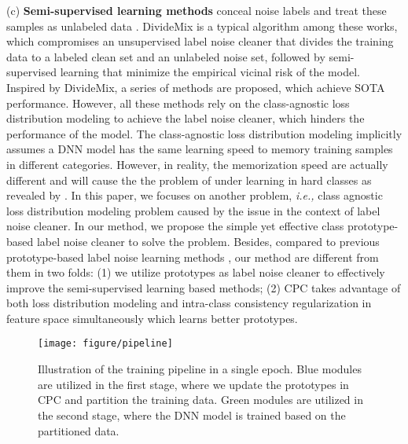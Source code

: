 \documentclass{article} \usepackage{iclr2023_conference,times}
\begin{document}
(c) \textbf{Semi-supervised learning methods} conceal noise labels and treat these samples as unlabeled data \citep{Ding2018AST}. DivideMix \citep{Li2020DivideMixLW} is a typical algorithm among these works, which compromises an unsupervised label noise cleaner that divides the training data to a labeled clean set and an unlabeled noise set, followed by semi-supervised learning that minimize the empirical vicinal risk of the model. Inspired by DivideMix, a series of methods \citep{cordeiro2022longremix,nishi2021augmentation,Cordeiro2021PropMixHS} are proposed, which achieve SOTA performance. However, all these methods rely on  the class-agnostic loss distribution modeling to achieve the label noise cleaner, which hinders the performance of the model. The class-agnostic loss distribution modeling implicitly assumes a DNN model has the same learning speed to memory training samples in different categories. However, in reality, the memorization speed are actually different and will cause the the problem of under learning in hard classes as revealed by \citet{wang2019symmetric}. In this paper, we focuses on another problem, \emph{i.e.,} class agnostic loss distribution modeling problem caused by the issue in the context of label noise cleaner. In our method, we propose the simple yet effective class prototype-based label noise cleaner to solve the problem. Besides, compared to previous prototype-based label noise learning methods \citep{li2020mopro,li2021learning}, our method are different from them in two folds: (1) we utilize prototypes as label noise cleaner to effectively improve the semi-supervised learning based methods; (2) CPC takes advantage of both loss distribution modeling and intra-class consistency regularization in feature space simultaneously which learns better prototypes.

\begin{figure}[t]
\center
  \texttt{[image: figure/pipeline]}
\caption{Illustration of the training pipeline in a single epoch. Blue modules are utilized in the first stage, where we update the prototypes in CPC and partition the training data.
   Green modules are utilized in the second stage, where the DNN model is trained based on the partitioned data.}
  \vspace{-1\baselineskip}
   \label{fig:pipeline}
\end{figure}
\end{document}
